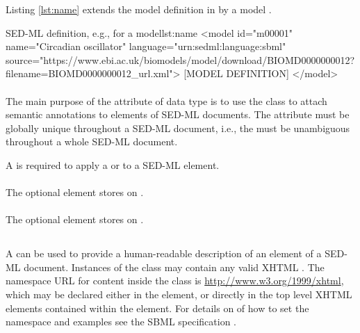Listing \ref{lst:name} extends the model definition in  by a model .

\begin{myXmlLst}{SED-ML  definition, e.g., for a model}{lst:name}
<model id="m00001" name="Circadian oscillator" language="urn:sedml:language:sbml"
        source="https://www.ebi.ac.uk/biomodels/model/download/BIOMD0000000012?filename=BIOMD0000000012_url.xml">
	[MODEL DEFINITION]
</model>
\end{myXmlLst}



\paragraph*{}
\label{sec:metaid}
The main purpose of the  attribute of data type  is to use the \Annotation class to attach semantic annotations to elements of SED-ML documents. The  attribute must be globally unique throughout a SED-ML document, i.e., the  must be unambiguous throughout a whole SED-ML document.

A  is required to apply a \Notes or \Annotation to a SED-ML element.

\paragraph*{}
\label{sec:notesElement}
The optional  element stores \Notes on \SedBase.

\paragraph*{}
\label{sec:annotationElement}
The optional  element stores \Annotation on \SedBase.

\subsection{}
\label{class:notes}
A  can be used to provide a human-readable description of an element of a SED-ML document. Instances of the  class may contain any valid XHTML \citep{P+02}. The namespace URL for  content inside the \Notes class is \url{http://www.w3.org/1999/xhtml}, which may be declared either in the \SedML element, or directly in the top level XHTML elements contained within the \hyperref[sec:notesElement]{} element. For details on of how to set the namespace and examples see the SBML specification \citep{HBH+10}.

